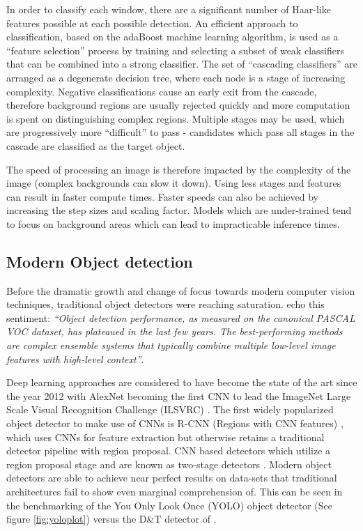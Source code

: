 \documentclass[a4paper,twoside,12pt]{report}
\begin{document}
In order to classify each window, there are a significant number of Haar-like features possible at each possible detection. An efficient approach to classification, based on the adaBoost machine learning algorithm, is used as a ``feature selection'' process by training and selecting a subset of weak classifiers that can be combined into a strong classifier. The set of ``cascading classifiers'' are arranged as a degenerate decision tree, where each node is a stage of increasing complexity. Negative classifications cause an early exit from the cascade, therefore background regions are usually rejected quickly and more computation is spent on distinguishing complex regions.  Multiple stages may be used, which are progressively more ``difficult'' to pass - candidates which pass all stages in the
cascade are classified as the target object.

The speed of processing an image is therefore impacted by the complexity of the image (complex backgrounds can slow it down). Using less stages and features can result in faster compute times. Faster speeds can also be achieved by increasing the step sizes and scaling factor. Models which are under-trained tend to focus on background areas which can lead to impracticable inference times. 

\newpage
\subsection{Modern Object detection}

Before the dramatic growth and change of focus towards modern computer vision techniques, traditional object detectors were reaching saturation. \citep{rcnn} echo this sentiment: \textit{``Object detection performance, as measured on the canonical PASCAL VOC dataset, has plateaued in the last few years. The best-performing methods are complex ensemble systems that typically combine multiple low-level image features with high-level context''}.

Deep learning approaches are considered to have become the state of the art since the year 2012 with AlexNet becoming the first CNN to lead the ImageNet Large Scale Visual Recognition Challenge (ILSVRC) \citep{alexnet}. The first widely popularized object detector to make use of CNNs is R-CNN (Regions with CNN features) \citep{rcnn}, which uses CNNs for feature extraction but otherwise retains a traditional detector pipeline with region proposal. CNN based detectors which utilize a region proposal stage and are known as two-stage detectors \citep{comprehensive}.  Modern object detectors are able to achieve near perfect results on data-sets that traditional architectures fail to show even marginal comprehension of. This can be seen in the benchmarking of the You Only Look Once (YOLO) object detector (See figure \ref{fig:yoloplot}) \citep{yolo} versus the D\&T detector of \cite{hog}.
\end{document}
